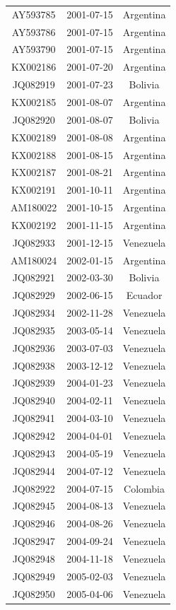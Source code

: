 \documentclass[a4paper,10pt]{article}
\begin{document}
\begin{center}
\begin{longtable}{ccc}
AY593785 & 2001-07-15 & Argentina \\
AY593786 & 2001-07-15 & Argentina \\
AY593790 & 2001-07-15 & Argentina \\
KX002186 & 2001-07-20 & Argentina \\
JQ082919 & 2001-07-23 & Bolivia \\
KX002185 & 2001-08-07 & Argentina \\
JQ082920 & 2001-08-07 & Bolivia \\
KX002189 & 2001-08-08 & Argentina \\
KX002188 & 2001-08-15 & Argentina \\
KX002187 & 2001-08-21 & Argentina \\
KX002191 & 2001-10-11 & Argentina \\
AM180022 & 2001-10-15 & Argentina \\
KX002192 & 2001-11-15 & Argentina \\
JQ082933 & 2001-12-15 & Venezuela \\
AM180024 & 2002-01-15 & Argentina \\
JQ082921 & 2002-03-30 & Bolivia \\
JQ082929 & 2002-06-15 & Ecuador \\
JQ082934 & 2002-11-28 & Venezuela \\
JQ082935 & 2003-05-14 & Venezuela \\
JQ082936 & 2003-07-03 & Venezuela \\
JQ082938 & 2003-12-12 & Venezuela \\
JQ082939 & 2004-01-23 & Venezuela \\
JQ082940 & 2004-02-11 & Venezuela \\
JQ082941 & 2004-03-10 & Venezuela \\
JQ082942 & 2004-04-01 & Venezuela \\
JQ082943 & 2004-05-19 & Venezuela \\
JQ082944 & 2004-07-12 & Venezuela \\
JQ082922 & 2004-07-15 & Colombia \\
JQ082945 & 2004-08-13 & Venezuela \\
JQ082946 & 2004-08-26 & Venezuela \\
JQ082947 & 2004-09-24 & Venezuela \\
JQ082948 & 2004-11-18 & Venezuela \\
JQ082949 & 2005-02-03 & Venezuela \\
JQ082950 & 2005-04-06 & Venezuela \\

\end{longtable}
\end{center}
\end{document}
